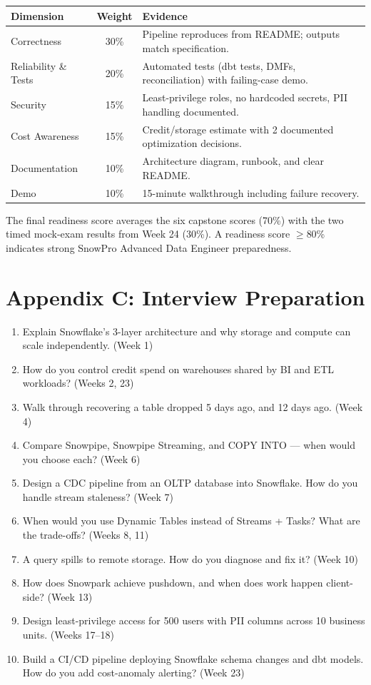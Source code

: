 \documentclass[11pt, a4paper]{article}
\begin{document}
\begin{center}
\renewcommand{\arraystretch}{1.3}
\begin{tabular}{@{} l c p{7.5cm} @{}}
\toprule
\textbf{Dimension} & \textbf{Weight} & \textbf{Evidence} \\
\midrule
Correctness & 30\% & Pipeline reproduces from README; outputs match specification. \\
Reliability \& Tests & 20\% & Automated tests (dbt tests, DMFs, reconciliation) with failing-case demo. \\
Security & 15\% & Least-privilege roles, no hardcoded secrets, PII handling documented. \\
Cost Awareness & 15\% & Credit/storage estimate with 2 documented optimization decisions. \\
Documentation & 10\% & Architecture diagram, runbook, and clear README. \\
Demo & 10\% & 15-minute walkthrough including failure recovery. \\
\bottomrule
\end{tabular}
\end{center}

The final readiness score averages the six capstone scores (70\%) with the two timed mock-exam results from Week 24 (30\%). A readiness score $\geq$80\% indicates strong SnowPro Advanced Data Engineer preparedness.

\section{Appendix C: Interview Preparation}
\begin{enumerate}
    \item Explain Snowflake's 3-layer architecture and why storage and compute can scale independently. (Week 1)
    \item How do you control credit spend on warehouses shared by BI and ETL workloads? (Weeks 2, 23)
    \item Walk through recovering a table dropped 5 days ago, and 12 days ago. (Week 4)
    \item Compare Snowpipe, Snowpipe Streaming, and COPY INTO --- when would you choose each? (Week 6)
    \item Design a CDC pipeline from an OLTP database into Snowflake. How do you handle stream staleness? (Week 7)
    \item When would you use Dynamic Tables instead of Streams + Tasks? What are the trade-offs? (Weeks 8, 11)
    \item A query spills to remote storage. How do you diagnose and fix it? (Week 10)
    \item How does Snowpark achieve pushdown, and when does work happen client-side? (Week 13)
    \item Design least-privilege access for 500 users with PII columns across 10 business units. (Weeks 17--18)
    \item Build a CI/CD pipeline deploying Snowflake schema changes and dbt models. How do you add cost-anomaly alerting? (Week 23)
\end{enumerate}
\end{document}
